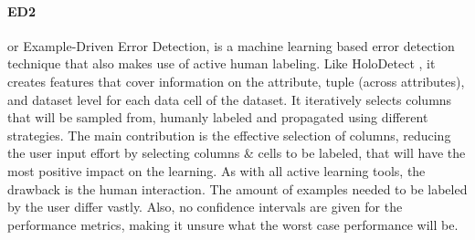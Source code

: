 \paragraph{ED2 \cite{Neutatz2019-aw}} or Example-Driven Error Detection, is a machine learning based error detection technique that also makes use of active human labeling. 
Like HoloDetect \cite{Heidari2019-ox}, it creates features that cover information on the attribute, tuple (across attributes), and dataset level for each data cell of the dataset. It iteratively selects columns that will be sampled from, humanly labeled and propagated using different strategies. The main contribution is the effective selection of columns, reducing the user input effort by selecting columns \& cells to be labeled, that will have the most positive impact on the learning. As with all active learning tools, the drawback is the human interaction. The amount of examples needed to be labeled by the user differ vastly. Also, no confidence intervals are given for the performance metrics, making it unsure what the worst case performance will be. 